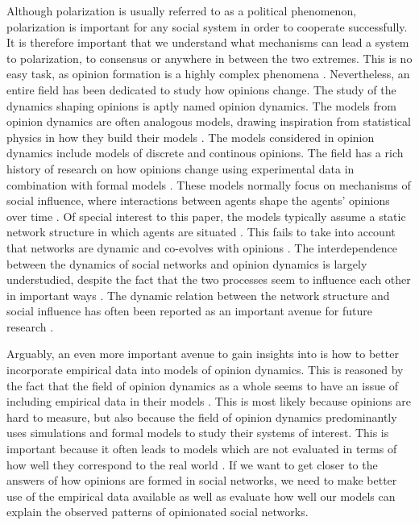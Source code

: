 \documentclass{article}
\begin{document}
Although polarization is usually referred to as a political phenomenon, polarization is important for any social system in order to cooperate successfully. It is therefore important that we understand what mechanisms can lead a system to polarization, to consensus or anywhere in between the two extremes. This is no easy task, as opinion formation is a highly complex phenomena \cite{baumann_modeling_2021}. 
Nevertheless, an entire field has been dedicated to study how opinions change. The study of the dynamics shaping opinions is aptly named opinion dynamics. The models from opinion dynamics are often analogous models, drawing inspiration from statistical physics in how they build their models \cite{galesic_integrating_2021}. The models considered in opinion dynamics include models of discrete and continous opinions. The field has a rich history of research on how opinions change using experimental data in combination with formal models \cite{baumann_modeling_2021,chacoma_opinion_2015,flache_models_2017,friedkin_social_1990,noorazar_classical_2020,spears_social_2021,turner_paths_2018}. These models normally focus on mechanisms of social influence, where interactions between agents shape the agents’ opinions over time \cite{flache_models_2017}. Of special interest to this paper, the models typically assume a static network structure in which agents are situated \cite{galesic_integrating_2021}. This fails to take into account that networks are dynamic and co-evolves with opinions \cite{ferraz_de_arruda_modelling_2022,galesic_integrating_2021}. The interdependence between the dynamics of social networks and opinion dynamics is largely understudied, despite the fact that the two processes seem to influence each other in important ways \cite{asikainen_cumulative_2020,bruch_agent-based_2015,galesic_integrating_2021,kossinets_origins_2009,noorazar_classical_2020}. The dynamic relation between the network structure and social influence has often been reported as an important avenue for future research \cite{flache_models_2017,galesic_integrating_2021}. 

Arguably, an even more important avenue to gain insights into is how to better incorporate empirical data into models of opinion dynamics. This is reasoned by the fact that the field of opinion dynamics as a whole seems to have an issue of including empirical data in their models \cite{galesic_integrating_2021,flache_models_2017}. 
This is most likely because opinions are hard to measure, but also because the field of opinion dynamics predominantly uses simulations and formal models to study their systems of interest. This is important because it often leads to models which are not evaluated in terms of how well they correspond to the real world \cite{flache_models_2017,galesic_integrating_2021}. If we want to get closer to the answers of how opinions are formed in social networks, we need to make better use of the empirical data available as well as evaluate how well our models can explain the observed patterns of opinionated social networks. 
\end{document}
